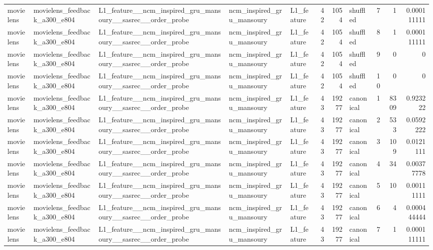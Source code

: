 \begin{table}[htbp!]
\begin{tabular}{lllllrrlrrr}
movielens & movielens\_feedback\_a300\_e804 & L1\_feature\_\_ncm\_inspired\_gru\_mansoury\_\_sasrec\_\_order\_probe & ncm\_inspired\_gru\_mansoury & L1\_feature & 42 & 1054 & shuffled & 7 & 1 & 0.000111111 \\
movielens & movielens\_feedback\_a300\_e804 & L1\_feature\_\_ncm\_inspired\_gru\_mansoury\_\_sasrec\_\_order\_probe & ncm\_inspired\_gru\_mansoury & L1\_feature & 42 & 1054 & shuffled & 8 & 1 & 0.000111111 \\
movielens & movielens\_feedback\_a300\_e804 & L1\_feature\_\_ncm\_inspired\_gru\_mansoury\_\_sasrec\_\_order\_probe & ncm\_inspired\_gru\_mansoury & L1\_feature & 42 & 1054 & shuffled & 9 & 0 & 0 \\
movielens & movielens\_feedback\_a300\_e804 & L1\_feature\_\_ncm\_inspired\_gru\_mansoury\_\_sasrec\_\_order\_probe & ncm\_inspired\_gru\_mansoury & L1\_feature & 42 & 1054 & shuffled & 10 & 0 & 0 \\
movielens & movielens\_feedback\_a300\_e804 & L1\_feature\_\_ncm\_inspired\_gru\_mansoury\_\_sasrec\_\_order\_probe & ncm\_inspired\_gru\_mansoury & L1\_feature & 43 & 19277 & canonical & 1 & 8309 & 0.923222 \\
movielens & movielens\_feedback\_a300\_e804 & L1\_feature\_\_ncm\_inspired\_gru\_mansoury\_\_sasrec\_\_order\_probe & ncm\_inspired\_gru\_mansoury & L1\_feature & 43 & 19277 & canonical & 2 & 533 & 0.0592222 \\
movielens & movielens\_feedback\_a300\_e804 & L1\_feature\_\_ncm\_inspired\_gru\_mansoury\_\_sasrec\_\_order\_probe & ncm\_inspired\_gru\_mansoury & L1\_feature & 43 & 19277 & canonical & 3 & 109 & 0.0121111 \\
movielens & movielens\_feedback\_a300\_e804 & L1\_feature\_\_ncm\_inspired\_gru\_mansoury\_\_sasrec\_\_order\_probe & ncm\_inspired\_gru\_mansoury & L1\_feature & 43 & 19277 & canonical & 4 & 34 & 0.00377778 \\
movielens & movielens\_feedback\_a300\_e804 & L1\_feature\_\_ncm\_inspired\_gru\_mansoury\_\_sasrec\_\_order\_probe & ncm\_inspired\_gru\_mansoury & L1\_feature & 43 & 19277 & canonical & 5 & 10 & 0.00111111 \\
movielens & movielens\_feedback\_a300\_e804 & L1\_feature\_\_ncm\_inspired\_gru\_mansoury\_\_sasrec\_\_order\_probe & ncm\_inspired\_gru\_mansoury & L1\_feature & 43 & 19277 & canonical & 6 & 4 & 0.000444444 \\
movielens & movielens\_feedback\_a300\_e804 & L1\_feature\_\_ncm\_inspired\_gru\_mansoury\_\_sasrec\_\_order\_probe & ncm\_inspired\_gru\_mansoury & L1\_feature & 43 & 19277 & canonical & 7 & 1 & 0.000111111 \\

\end{tabular}
\end{table}
